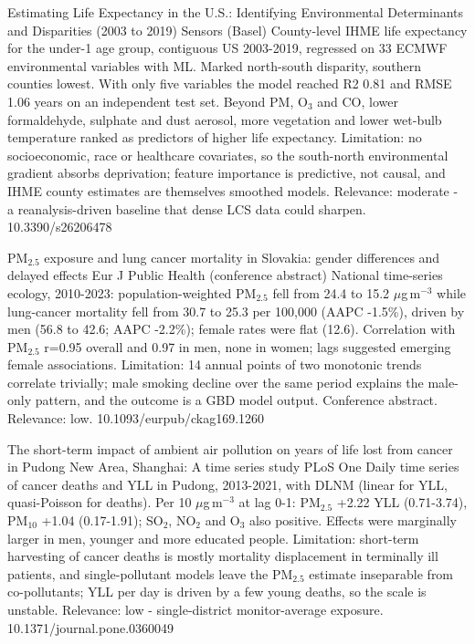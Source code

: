 \documentclass[10pt]{article}
\begin{document}
{Estimating Life Expectancy in the U.S.: Identifying Environmental Determinants and Disparities (2003 to 2019)}
{Sensors (Basel)}
{County-level IHME life expectancy for the under-1 age group, contiguous US 2003-2019, regressed on 33 ECMWF environmental variables with ML. Marked north-south disparity, southern counties lowest. With only five variables the model reached R2 0.81 and RMSE 1.06 years on an independent test set. Beyond PM, O$_3$ and CO, lower formaldehyde, sulphate and dust aerosol, more vegetation and lower wet-bulb temperature ranked as predictors of higher life expectancy. Limitation: no socioeconomic, race or healthcare covariates, so the south-north environmental gradient absorbs deprivation; feature importance is predictive, not causal, and IHME county estimates are themselves smoothed models. Relevance: moderate - a reanalysis-driven baseline that dense LCS data could sharpen.}
{10.3390/s26206478}

\par{}\baselineskip{}\baselineskip
{}

{PM$_{2.5}$ exposure and lung cancer mortality in Slovakia: gender differences and delayed effects}
{Eur J Public Health (conference abstract)}
{National time-series ecology, 2010-2023: population-weighted PM$_{2.5}$ fell from 24.4 to 15.2 $\mu$g\,m$^{-3}$ while lung-cancer mortality fell from 30.7 to 25.3 per 100,000 (AAPC -1.5\%), driven by men (56.8 to 42.6; AAPC -2.2\%); female rates were flat (12.6). Correlation with PM$_{2.5}$ r=0.95 overall and 0.97 in men, none in women; lags suggested emerging female associations. Limitation: 14 annual points of two monotonic trends correlate trivially; male smoking decline over the same period explains the male-only pattern, and the outcome is a GBD model output. Conference abstract. Relevance: low.}
{10.1093/eurpub/ckag169.1260}

{The short-term impact of ambient air pollution on years of life lost from cancer in Pudong New Area, Shanghai: A time series study}
{PLoS One}
{Daily time series of cancer deaths and YLL in Pudong, 2013-2021, with DLNM (linear for YLL, quasi-Poisson for deaths). Per 10 $\mu$g\,m$^{-3}$ at lag 0-1: PM$_{2.5}$ +2.22 YLL (0.71-3.74), PM$_{10}$ +1.04 (0.17-1.91); SO$_2$, NO$_2$ and O$_3$ also positive. Effects were marginally larger in men, younger and more educated people. Limitation: short-term harvesting of cancer deaths is mostly mortality displacement in terminally ill patients, and single-pollutant models leave the PM$_{2.5}$ estimate inseparable from co-pollutants; YLL per day is driven by a few young deaths, so the scale is unstable. Relevance: low - single-district monitor-average exposure.}
{10.1371/journal.pone.0360049}
\end{document}
